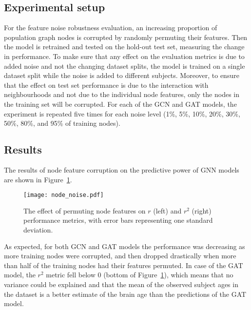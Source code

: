 \subsection{Experimental setup}
For the feature noise robustness evaluation, an increasing proportion of population graph nodes is corrupted by randomly permuting their features. Then the model is retrained and tested on the hold-out test set, measuring the change in performance. To make sure that any effect on the evaluation metrics is due to added noise and not the changing dataset splits, the model is trained on a single dataset split while the noise is added to different subjects. Moreover, to ensure that the effect on test set performance is due to the interaction with neighbourhoods and not due to the individual node features, only the nodes in the training set will be corrupted. For each of the GCN and GAT models, the experiment is repeated five times for each noise level (1\%, 5\%, 10\%, 20\%, 30\%, 50\%, 80\%, and 95\% of training nodes).

\subsection{Results}

The results of node feature corruption on the predictive power of GNN models are shown in Figure~\ref{figure:node-noise}.

\begin{figure}[h]
    \centering
    \texttt{[image: node\_noise.pdf]}
    \caption{The effect of permuting node features on $r$ (left) and $r^2$ (right) performance metrics, with error bars representing one standard deviation.}\label{figure:node-noise}
\end{figure}

As expected, for both GCN and GAT models the performance was decreasing as more training nodes were corrupted, and then dropped drastically when more than half of the training nodes had their features permuted. In case of the GAT model, the $r^2$ metric fell below 0 (bottom of Figure~\ref{figure:node-noise}), which means that no variance could be explained and that the mean of the observed subject ages in the dataset is a better estimate of the brain age than the predictions of the GAT model. 



